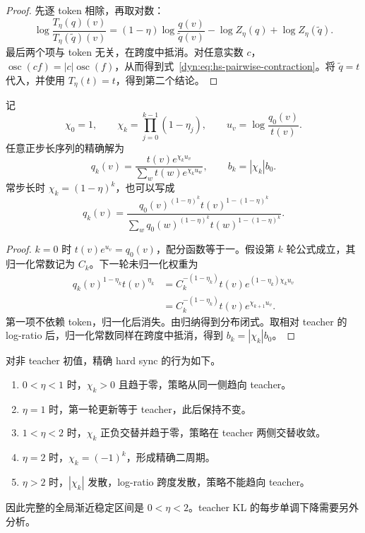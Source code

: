 \documentclass[lang=cn,scheme=chinese,openany]{../book/elegantbook}
\begin{document}
\begin{proof}
先逐 token 相除，再取对数：
\begin{equation*}
 \log\frac{T_\eta(q)(v)}{T_\eta(\widetilde q)(v)}
 =(1-\eta)\log\frac{q(v)}{\widetilde q(v)}
 -\log Z_\eta(q)+\log Z_\eta(\widetilde q).
\end{equation*}
最后两个项与 token 无关，在跨度中抵消。对任意实数 $c$，$\operatorname{osc}(cf)=|c|\operatorname{osc}(f)$，从而得到式~\eqref{dyn:eq:hs-pairwise-contraction}。将 $\widetilde q=t$ 代入，并使用 $T_\eta(t)=t$，得到第二个结论。
\end{proof}

\begin{theorem}[常步长与变步长的精确解]
\label{dyn:thm:hard-sync}
记
\begin{equation*}
 \chi_0=1,\qquad \chi_k=\prod_{j=0}^{k-1}(1-\eta_j),
 \qquad u_v=\log\frac{q_0(v)}{t(v)}.
\end{equation*}
任意正步长序列的精确解为
\begin{equation}\label{dyn:eq:hard-closed}
 q_k(v)=\frac{t(v)e^{\chi_k u_v}}
 {\sum_wt(w)e^{\chi_k u_w}},
 \qquad b_k=|\chi_k|b_0.
\end{equation}
常步长时 $\chi_k=(1-\eta)^k$，也可以写成
\begin{equation*}
 q_k(v)=\frac{q_0(v)^{(1-\eta)^k}
 t(v)^{1-(1-\eta)^k}}
 {\sum_wq_0(w)^{(1-\eta)^k}
 t(w)^{1-(1-\eta)^k}}.
\end{equation*}
\end{theorem}

\begin{proof}
$k=0$ 时 $t(v)e^{u_v}=q_0(v)$，配分函数等于一。假设第 $k$ 轮公式成立，其归一化常数记为 $C_k$。下一轮未归一化权重为
\begin{align*}
 q_k(v)^{1-\eta_k}t(v)^{\eta_k}
 &=C_k^{-(1-\eta_k)}t(v)
       e^{(1-\eta_k)\chi_k u_v}\\
 &=C_k^{-(1-\eta_k)}t(v)e^{\chi_{k+1}u_v}.
\end{align*}
第一项不依赖 token，归一化后消失。由归纳得到分布闭式。取相对 teacher 的 log-ratio 后，归一化常数同样在跨度中抵消，得到 $b_k=|\chi_k|b_0$。
\end{proof}

\begin{corollary}[常步长的完整稳定分类]
对非 teacher 初值，精确 hard sync 的行为如下。
\begin{enumerate}
 \item $0<\eta<1$ 时，$\chi_k>0$ 且趋于零，策略从同一侧趋向 teacher。
 \item $\eta=1$ 时，第一轮更新等于 teacher，此后保持不变。
 \item $1<\eta<2$ 时，$\chi_k$ 正负交替并趋于零，策略在 teacher 两侧交替收敛。
 \item $\eta=2$ 时，$\chi_k=(-1)^k$，形成精确二周期。
 \item $\eta>2$ 时，$|\chi_k|$ 发散，log-ratio 跨度发散，策略不能趋向 teacher。
\end{enumerate}
因此完整的全局渐近稳定区间是 $0<\eta<2$。teacher KL 的每步单调下降需要另外分析。
\end{corollary}
\end{document}
